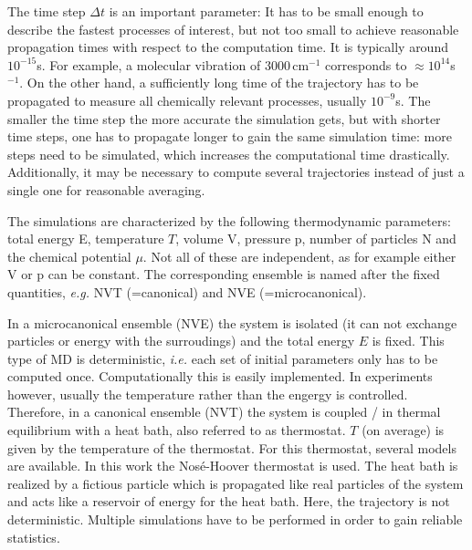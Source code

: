 \documentclass[11pt,DIV=13,BCOR=5mm,a4paper,headinclude]{scrbook}
\begin{document}
The time step $\Delta t$ is an important parameter: It has to be small enough to describe the fastest processes of interest, but not too small to achieve reasonable propagation times with respect to the computation time.
It is typically around $10^{-15}$s.
For example, a molecular vibration of $3000\,$cm$^{-1}$ corresponds to $\approx 10^{14}$s$^{-1}$.
On the other hand, a sufficiently long time of the trajectory has to be propagated to measure all chemically relevant processes, usually $10^{-9}$s.
The smaller the time step the more accurate the simulation gets, but with shorter time steps, one has to propagate longer to gain the same simulation time: more steps need to be simulated, which increases the computational time drastically.
Additionally, it may be necessary to compute several trajectories instead of just a single one for reasonable averaging.


The simulations are characterized by the following thermodynamic parameters: total energy E, temperature $T$, volume V, pressure p, number of particles N and the chemical potential $\mu$.
Not all of these are independent, as for example either V or p can be constant.
The corresponding ensemble is named after the fixed quantities, \textit{e.g.} NVT (=canonical) and NVE (=microcanonical).


In a microcanonical ensemble (NVE) the system is isolated (it can not exchange particles or energy with the surroudings) and the total energy $E$ is fixed.
This type of MD is deterministic, \textit{i.e.} each set of initial parameters only has to be computed once.
Computationally this is easily implemented.
In experiments however, usually the temperature rather than the engergy is controlled.
Therefore, in a canonical ensemble (NVT) the system is coupled / in thermal equilibrium with a heat bath, also referred to as thermostat.
$T$ (on average) is given by the temperature of the thermostat.
For this thermostat, several models are available.
In this work the Nos\'{e}-Hoover thermostat\cite{nose1984,nose1984_2,hoover1985} is used.
The heat bath is realized by a fictious particle which is propagated like real particles of the system and acts like a reservoir of energy for the heat bath.
Here, the trajectory is not deterministic.
Multiple simulations have to be performed in order to gain reliable statistics.
\end{document}
